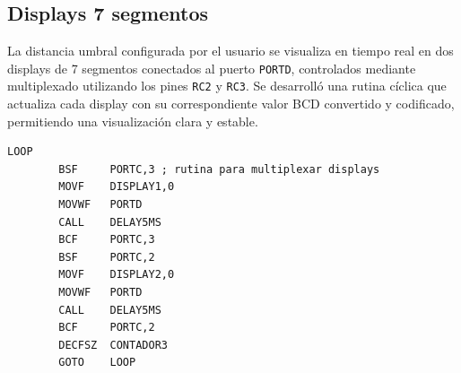 \documentclass[]{article}
\begin{document}
	
	\newpage
	\thispagestyle{fancy}
	\subsection{Displays 7 segmentos}
	La distancia umbral configurada por el usuario se visualiza en tiempo real en dos displays de 7 segmentos conectados al puerto \texttt{PORTD}, controlados mediante multiplexado utilizando los pines \texttt{RC2} y \texttt{RC3}. Se desarrolló una rutina cíclica que actualiza cada display con su correspondiente valor BCD convertido y codificado, permitiendo una visualización clara y estable.
	\begin{lstlisting}[caption={Multiplexado de displays}, label={lst:displays}]
		LOOP
		BSF	    PORTC,3 ; rutina para multiplexar displays
		MOVF    DISPLAY1,0
		MOVWF   PORTD
		CALL    DELAY5MS
		BCF	    PORTC,3
		BSF	    PORTC,2
		MOVF    DISPLAY2,0
		MOVWF   PORTD
		CALL    DELAY5MS
		BCF	    PORTC,2
		DECFSZ  CONTADOR3
		GOTO    LOOP
	\end{lstlisting}
	
\end{document}
